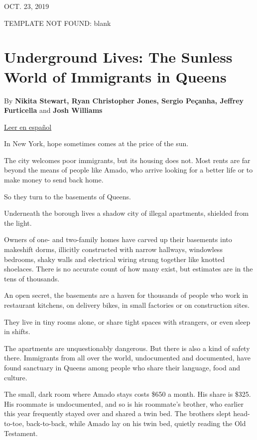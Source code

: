 OCT. 23, 2019

TEMPLATE NOT FOUND: blank

\hypertarget{underground-lives-the-sunless-world-of-immigrants-in-queens-1}{%
\section{Underground Lives: The Sunless World of Immigrants in
Queens}\label{underground-lives-the-sunless-world-of-immigrants-in-queens-1}}

By \textbf{Nikita Stewart, Ryan Christopher Jones, Sergio Peçanha,
Jeffrey Furticella} and \textbf{Josh Williams}

\href{https://www.nytimes3xbfgragh.onion/interactive/2019/10/28/nyregion/migrantes-queens-sotanos.html}{Leer
en español}

In New York, hope sometimes comes at the price of the sun.

The city welcomes poor immigrants, but its housing does not. Most rents
are far beyond the means of people like Amado, who arrive looking for a
better life or to make money to send back home.

So they turn to the basements of Queens.

Underneath the borough lives a shadow city of illegal apartments,
shielded from the light.

Owners of one- and two-family homes have carved up their basements into
makeshift dorms, illicitly constructed with narrow hallways, windowless
bedrooms, shaky walls and electrical wiring strung together like knotted
shoelaces. There is no accurate count of how many exist, but estimates
are in the tens of thousands.

An open secret, the basements are a haven for thousands of people who
work in restaurant kitchens, on delivery bikes, in small factories or on
construction sites.

They live in tiny rooms alone, or share tight spaces with strangers, or
even sleep in shifts.

The apartments are unquestionably dangerous. But there is also a kind of
safety there. Immigrants from all over the world, undocumented and
documented, have found sanctuary in Queens among people who share their
language, food and culture.

The small, dark room where Amado stays costs \$650 a month. His share is
\$325. His roommate is undocumented, and so is his roommate's brother,
who earlier this year frequently stayed over and shared a twin bed. The
brothers slept head-to-toe, back-to-back, while Amado lay on his twin
bed, quietly reading the Old Testament.

